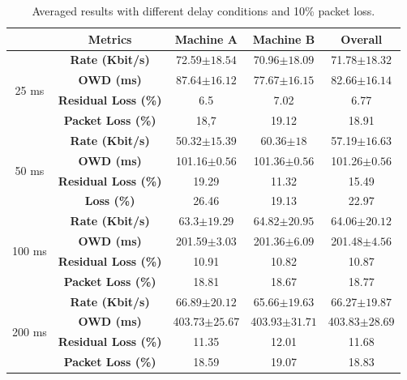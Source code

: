 \begin{table}[h]
\begin{center}
\begin{tabular}{ |c|c|c|c|c| }
\hline
 & Metrics & Machine A & Machine B & Overall\\ \hline
\multirow{4}{*}{25 ms} & \textbf{Rate (Kbit/s)} & 72.59$\pm18.54$ & 70.96$\pm18.09$ & 71.78$\pm18.32$\\ \cline{2-5}
 & \textbf{OWD (ms)} &  87.64$\pm16.12$ & 77.67$\pm16.15$ & 82.66$\pm16.14$ \\ \cline{2-5}
 & \textbf{Residual Loss (\%)} & 6.5 & 7.02 & 6.77 \\ \cline{2-5}
 & \textbf{Packet Loss (\%)} & 18,7 & 19.12 & 18.91 \\ \hline
\multirow{4}{*}{50 ms} & \textbf{Rate (Kbit/s)} & 50.32$\pm15.39$ & 60.36$\pm18$ & 57.19$\pm16.63$\\ \cline{2-5}
 & \textbf{OWD (ms)} & 101.16$\pm0.56$ & 101.36$\pm0.56$ & 101.26$\pm0.56$ \\ \cline{2-5}
 & \textbf{Residual Loss (\%)} & 19.29 & 11.32 & 15.49 \\ \cline{2-5}
 & \textbf{Loss (\%)} & 26.46 & 19.13 & 22.97 \\ \hline
\multirow{4}{*}{100 ms} & \textbf{Rate (Kbit/s)} & 63.3$\pm19.29$ & 64.82$\pm20.95$ & 64.06$\pm20.12$\\ \cline{2-5}
 & \textbf{OWD (ms)} & 201.59$\pm3.03$ & 201.36$\pm6.09$ & 201.48$\pm4.56$ \\ \cline{2-5}
 & \textbf{Residual Loss (\%)} & 10.91 & 10.82 & 10.87 \\ \cline{2-5}
 & \textbf{Packet Loss (\%)} & 18.81 & 18.67 & 18.77 \\ \hline
\multirow{4}{*}{200 ms} & \textbf{Rate (Kbit/s)} & 66.89$\pm20.12$ & 65.66$\pm19.63$ & 66.27$\pm19.87$\\ \cline{2-5}
 & \textbf{OWD (ms)} & 403.73$\pm25.67$ & 403.93$\pm31.71$ & 403.83$\pm28.69$ \\ \cline{2-5}
 & \textbf{Residual Loss (\%)} & 11.35 & 12.01 & 11.68 \\ \cline{2-5}
 & \textbf{Packet Loss (\%)} & 18.59 & 19.07 & 18.83 \\ \hline
\end{tabular}
    \caption[Averaged results with different delay conditions and 10\% packet loss]{Averaged results with different delay conditions and 10\% packet loss.}
    \label{fig:p2p_delay_loss_bw}
\end{center}
\end{table}

